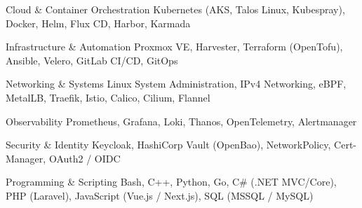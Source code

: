 
\begin{cvskills}

  \cvskill
    {Cloud \& Container Orchestration} %
    {Kubernetes (AKS, Talos Linux, Kubespray), Docker, Helm, Flux CD, Harbor, Karmada} %

  \cvskill
    {Infrastructure \& Automation} %
    {Proxmox VE, Harvester, Terraform (OpenTofu), Ansible, Velero, GitLab CI/CD, GitOps} %
    
  \cvskill
    {Networking \& Systems} %
    {Linux System Administration, IPv4 Networking, eBPF, MetalLB, Traefik, Istio, Calico, Cilium, Flannel} %
    
  \cvskill
    {Observability} %
    {Prometheus, Grafana, Loki, Thanos, OpenTelemetry, Alertmanager} %

  \cvskill
    {Security \& Identity} %
    {Keycloak, HashiCorp Vault (OpenBao), NetworkPolicy, Cert-Manager, OAuth2 / OIDC} %

  \cvskill
    {Programming \& Scripting} %
    {Bash, C++, Python, Go, C\# (.NET MVC/Core), PHP (Laravel), JavaScript (Vue.js / Next.js), SQL (MSSQL / MySQL)} %



\end{cvskills}
